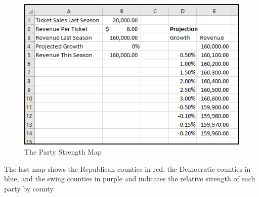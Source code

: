 \begin{figure}[H]
	\centering
	\includegraphics[width=\maxwidth{.95\linewidth}]{gfx/ch08_fig43}
	\caption{The Party Strength Map}
	\label{08:fig43}
\end{figure}

The last map shows the Republican counties in red, the Democratic counties in blue, and the swing counties in purple and indicates the relative strength of each party by county.
